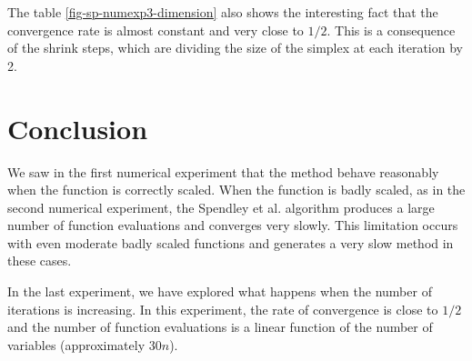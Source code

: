 The table \ref{fig-sp-numexp3-dimension} also shows the interesting 
fact that the convergence rate is almost constant and 
very close to $1/2$. This is a consequence of the shrink steps,
which are dividing the size of the simplex at each iteration by 2.

\section{Conclusion}

We saw in the first numerical experiment that the method 
behave reasonably when the function is correctly scaled.
When the function is badly scaled, as in the second numerical 
experiment, the Spendley et al. algorithm produces a large 
number of function evaluations and converges very slowly.
This limitation occurs with even moderate badly scaled 
functions and generates a very slow method in these 
cases.

In the last experiment, we have explored what happens when the number of 
iterations is increasing. In this experiment, the rate of convergence is close to $1/2$
and the number of function evaluations is a linear function of the number 
of variables (approximately $30n$).

